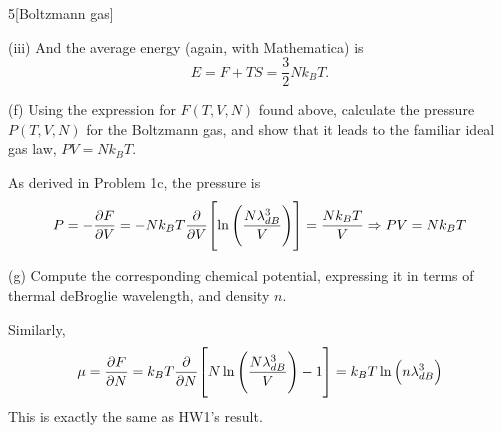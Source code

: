 \documentclass[12pt]{article}
\begin{document}
\begin{problem}{5}[Boltzmann gas]
\begin{solution}
(iii) And the average energy (again, with Mathematica) is
\begin{equation}
    E=F+TS
    =\frac32Nk_BT.
\end{equation}
\end{solution}

(f) Using the expression for $F(T,V,N)$ found above, calculate the pressure
$P(T,V,N)$ for the Boltzmann gas, and show that it leads to the familiar ideal
gas law, $PV=Nk_BT$.

\begin{solution}
As derived in Problem 1c, the pressure is
\begin{equation}
    P=-\frac{\partial F}{\partial V}   
    =-Nk_BT\frac{\partial}{\partial V}\qty[\ln\qty(\frac{N\lambda_{dB}^3}{V})]
    =\frac{Nk_BT}{V}\Rightarrow PV=Nk_BT
\end{equation}
\end{solution}

(g) Compute the corresponding chemical potential, expressing it in terms of
thermal deBroglie wavelength, and density $n$.

\begin{solution}
Similarly,
\begin{equation}
    \mu=\frac{\partial F}{\partial N}
    =k_BT\frac{\partial}{\partial N}\qty[N\ln\qty(\frac{N\lambda_{dB}^3}{V})-1]
    =k_BT\ln\qty(n\lambda_{dB}^3)
\end{equation}
This is exactly the same as HW1's result.
\end{solution}

\end{problem}
\newpage
\end{document}
